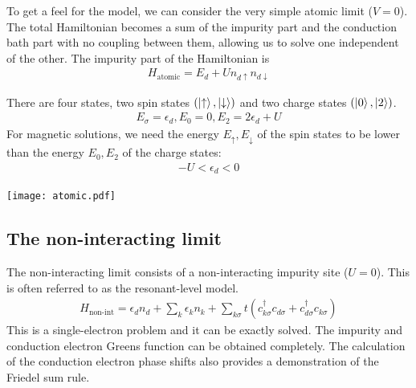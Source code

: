 To get a feel for the model, we can consider the very simple atomic limit (\(V = 0\)). The total Hamiltonian becomes a sum of the impurity part and the conduction bath part with no coupling between them, allowing us to solve one independent of the other. The impurity part of the Hamiltonian is
\begin{equation}\begin{aligned}
H_\text{atomic} = E_d + U n_{d\uparrow}n_{d\downarrow}
\end{aligned}\end{equation}
\noindent
\begin{minipage}{0.5\textwidth}
There are four states, two spin states \(\left(\ket{\uparrow}, \ket{\downarrow}\right) \) and two charge states \(\left( \ket{0}, \ket{2} \right) \).
\begin{equation}\begin{aligned}
	E_\sigma = \epsilon_d, E_0 = 0, E_2 = 2\epsilon_d + U
\end{aligned}\end{equation}
For magnetic solutions, we need the energy \(E_\uparrow, E_\downarrow\) of the spin states to be lower than the energy \(E_0,E_2\) of the charge states: 
\begin{equation}\begin{aligned}
	-U < \epsilon_d < 0
\end{aligned}\end{equation}
\end{minipage}
\hfill
\begin{minipage}{0.4\textwidth}
\centering
\texttt{[image: atomic.pdf]}
\end{minipage}

\subsection{The non-interacting limit}
The non-interacting limit consists of a non-interacting impurity site (\(U = 0\)). This is often referred to as the resonant-level model.
\begin{equation}\begin{aligned}
	H_\text{non-int} = \epsilon_d n_d + \sum_k \epsilon_k n_k + \sum_{k\sigma} t\left(c^\dagger_{k\sigma}c_{d\sigma}+c^\dagger_{d\sigma}c_{k\sigma}\right)
\end{aligned}\end{equation}
This is a single-electron problem and it can be exactly solved. The impurity and conduction electron Greens function can be obtained completely. The calculation of the conduction electron phase shifts also provides a demonstration of the Friedel sum rule.
